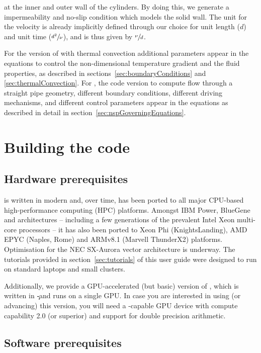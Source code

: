 \documentclass[a4paper, 11pt, DIV=11]{scrartcl}
\begin{document}
at the inner and outer wall of the cylinders. By doing this, we generate a
impermeability and no-slip condition which models the solid wall. The unit
for the velocity is already implicitly defined through our choice for unit
length ($d$) and unit time ($\sfrac{d^2}{\nu}$), and is thus given by
$\sfrac{\nu}{d}$.
\par
For the version of \nsc with thermal convection additional parameters appear
in the equations to control the non-dimensional temperature gradient and the
fluid properties, as described in sections~\ref{sec:boundaryConditions} and
\ref{sec:thermalConvection}. For \nsp, the code version to compute flow
through a straight pipe geometry, different boundary conditions, different
driving mechanisms, and different control parameters appear in the
equations as described in detail in section~\ref{sec:nspGoverningEquations}.



\section{Building the code}
\label{sec:buildingTheCode}

\subsection{Hardware prerequisites}
\label{sec:hardwarePrerequisites}

\nsc is written in modern \fortran and, over time, has been ported to all major
CPU-based high-performance computing (HPC) platforms. Amongst IBM Power,
BlueGene and  architectures -- including a few generations
of the prevalent Intel Xeon multi-core processors -- it has also been
ported to Xeon Phi (KnightsLanding), AMD EPYC (Naples, Rome) and ARMv8.1
(Marvell ThunderX2) platforms. Optimisation for the NEC SX-Aurora vector
architecture is underway. The tutorials provided in section~\ref{sec:tutorials} of
this user guide were designed to run on standard laptops and small clusters.
\par
Additionally, we provide a GPU-accelerated (but basic) version of \nsc, which is
written in \c-\cuda and runs on a single GPU. In case you are interested in using
(or advancing) this version, you will need a \cuda-capable GPU device with compute
capability 2.0 (or superior) and support for double precision arithmetic.

\subsection{Software prerequisites}
\label{sec:softwarePrerequisites}
\end{document}
